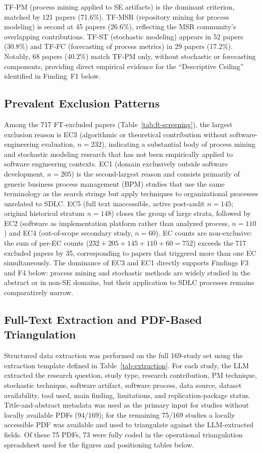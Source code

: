 TF-PM (process mining applied to SE artifacts) is the dominant criterion,
matched by 121 papers (71.6\%). TF-MSR (repository mining for process modeling)
is second at 45 papers (26.6\%), reflecting the MSR community's overlapping
contributions. TF-ST (stochastic modeling) appears in 52 papers (30.8\%) and
TF-FC (forecasting of process metrics) in 29 papers (17.2\%). Notably, 68
papers (40.2\%) match TF-PM only, without stochastic or forecasting components,
providing direct empirical evidence for the ``Descriptive Ceiling'' identified
in Finding~F1 below.

\subsection{Prevalent Exclusion Patterns}

Among the 717 FT-excluded papers (Table~\ref{tab:ft-screening}), the largest
exclusion reason is EC3 (algorithmic or theoretical contribution without
software-engineering evaluation, $n=232$), indicating a substantial body of
process mining and stochastic modeling research that has not been empirically
applied to software engineering contexts. EC1 (domain exclusively outside
software development, $n=205$) is the second-largest reason and consists
primarily of generic business process management (BPM) studies that use the
same terminology as the search strings but apply techniques to organizational
processes unrelated to SDLC. EC5 (full text inaccessible, active post-audit
$n=145$; original historical stratum $n=148$) closes the group of large
strata, followed by EC2 (software as implementation platform
rather than analyzed process, $n=110$) and EC4 (out-of-scope secondary study,
$n=60$). EC counts are non-exclusive: the sum of per-EC counts
($232+205+145+110+60 = 752$) exceeds the 717 excluded papers by 35,
corresponding to papers that triggered more than one EC simultaneously. The
dominance of EC3 and EC1 directly supports Findings F3 and F4
below: process mining and stochastic methods are widely studied in the
abstract or in non-SE domains, but their application to SDLC processes
remains comparatively narrow.

\subsection{Full-Text Extraction and PDF-Based Triangulation}
\label{sec:slr-pdf-enrichment}

Structured data extraction was performed on the full 169-study set using the
extraction template defined in Table~\ref{tab:extraction}. For each study,
the LLM extracted the research question, study type, research contribution,
PM technique, stochastic technique, software artifact, software process, data
source, dataset availability, tool used, main finding, limitations, and
replication-package status. Title-and-abstract metadata was used as the
primary input for studies without locally available PDFs (94/169); for the
remaining 75/169 studies a locally accessible PDF was available and used to
triangulate against the LLM-extracted fields. Of these 75 PDFs, 73 were
fully coded in the operational triangulation spreadsheet used for the
figures and positioning tables below.

